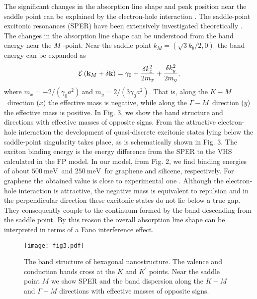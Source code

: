 \documentclass[reprint, superscriptaddress,  aps, pra]{revtex4-2}
\begin{document}
The significant changes in the absorption line shape and peak position near
the saddle point can be explained by the electron-hole interaction \cite%
{Yang}. The saddle-point excitonic resonances (SPER) have been extensively
investigated theoretically \cite{Phillips,Velicky,Kane,Balslev,SPE1}. The
changes in the absorption line shape can be understood from the band energy
near the $M$ -point. Near the saddle point $k_{M}=\left( \sqrt{3}%
k_{b}/2,0\right) $\ the band energy can be expanded as 
\begin{equation}
\mathcal{E}\left( \mathbf{k}_{M}+\delta \mathbf{k}\right) =\gamma _{0}+\frac{%
\delta k_{x}^{2}}{2m_{x}}+\frac{\delta k_{y}^{2}}{2m_{y}},  \label{near}
\end{equation}%
where $m_{x}=-2/\left( \gamma _{0}a^{2}\right) \ $and $m_{y}=2/\left(
3\gamma _{0}a^{2}\right) $. That is, along the $K-M$\ direction ($x$) the
effective mass is negative, while along the $\Gamma -M$\ direction ($y$) the
effective mass is positive. In Fig. 3, we show the band structure and
directions with effective masses of opposite signs. From the attractive
electron-hole interaction the development of quasi-discrete excitonic states
lying below the saddle-point singularity takes place, as is schematically
shown in Fig. 3. The exciton binding energy is the energy difference from
the SPER to the VHS calculated in the FP model. In our model, from Fig. 2,
we find binding energies of about $500\ \mathrm{meV}$\ and $250\ \mathrm{meV}
$\ for graphene and silicene, respectively. For graphene the obtained value
is close to experimental one \cite{Yang,Mak}. Although the electron-hole
interaction is attractive, the negative mass is equivalent to repulsion and
in the perpendicular direction these excitonic states do not lie below a
true gap. They consequently couple to the continuum formed by the band
descending from the saddle point. By this reason the overall absorption line
shape can be interpreted in terms of a Fano interference \cite%
{SPE1,Chae,Fano} effect. 
\begin{figure}[tbp]
\texttt{[image: fig3.pdf]}
\caption{The band structure of hexagonal nanostructure. The valence and
conduction bands cross at the $K$ and $K^{\prime }$ points. Near the saddle
point $M$ we show SPER and the band dispersion along the $K-M$ and $\Gamma -M
$ directions with effective masses of opposite signs.}
\end{figure}
\end{document}
